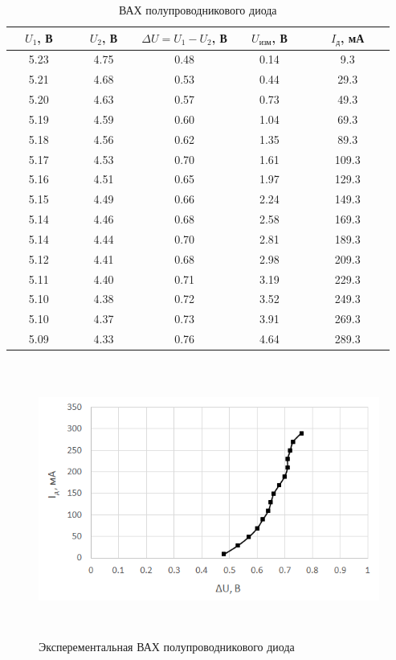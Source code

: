 \begin{table}[H]
	\begin{center}
	\caption{ВАХ полупроводникового диода}
	\def\arraystretch{1.2}
		\begin{tabular}{|c|c|c|c|c|}
		\hline 
		\ \ $U_1$, В\ \  & \ \ $U_2$, В\ \  & $\Delta U = U_1 - U_2$, В & \ \ $U_\text{изм}$, В\ \  & \ \ \ $I_\text{д}$, мА\ \ \ \\ 
		\hline 
		5.23 & 4.75 & 0.48 & 0.14 & 9.3 \\ 
		\hline 
		5.21 & 4.68 & 0.53 & 0.44 & 29.3 \\ 
		\hline 
		5.20 & 4.63 & 0.57 & 0.73 & 49.3 \\ 
		\hline 
		5.19 & 4.59 & 0.60 & 1.04 & 69.3 \\ 
		\hline 
		5.18 & 4.56 & 0.62 & 1.35 & 89.3 \\ 
		\hline 
		5.17 & 4.53 & 0.70 & 1.61 & 109.3 \\ 
		\hline 
		5.16 & 4.51 & 0.65 & 1.97 & 129.3 \\ 
		\hline 
		5.15 & 4.49 & 0.66 & 2.24 & 149.3 \\ 
		\hline 
		5.14 & 4.46 & 0.68 & 2.58 & 169.3 \\ 
		\hline 
		5.14 & 4.44 & 0.70 & 2.81 & 189.3 \\ 
		\hline 
		5.12 & 4.41 & 0.68 & 2.98 & 209.3 \\ 
		\hline 
		5.11 & 4.40 & 0.71 & 3.19 & 229.3 \\ 
		\hline 
		5.10 & 4.38 & 0.72 & 3.52 & 249.3 \\ 
		\hline 
		5.10 & 4.37 & 0.73 & 3.91 & 269.3 \\ 
		\hline 
		5.09 & 4.33 & 0.76 & 4.64 & 289.3 \\ 
		\hline 
		\end{tabular} 
		\label{tab:5:1}
	\end{center}
\end{table}

\begin{figure}[H]
	\begin{center}
		\includegraphics[width=15cm,height=9cm]{img/1}
		\caption{Эксперементальная ВАХ полупроводникового диода}
		\label{g:1} %
	\end{center}
\end{figure}

